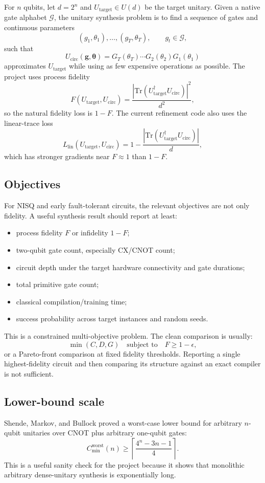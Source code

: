 \documentclass[11pt,a4paper]{article}
\newcommand{\Utarget}{U_{\mathrm{target}}}
\newcommand{\Ucirc}{U_{\mathrm{circ}}}
\newcommand{\Tr}{\mathrm{Tr}}
\begin{document}
For $n$ qubits, let $d=2^n$ and $\Utarget \in U(d)$ be the target unitary.
Given a native gate alphabet $\mathcal{G}$, the unitary synthesis problem is
to find a sequence of gates and continuous parameters
\[
  (g_1,\theta_1),\ldots,(g_T,\theta_T), \qquad g_t \in \mathcal{G},
\]
such that
\[
  \Ucirc(\bm{g},\bm{\theta})
  =
  G_T(\theta_T)\cdots G_2(\theta_2)G_1(\theta_1)
\]
approximates $\Utarget$ while using as few expensive operations as possible.
The project uses process fidelity
\[
  F(\Utarget,\Ucirc)
  =
  \frac{|\Tr(\Utarget^\dagger \Ucirc)|^2}{d^2},
\]
so the natural fidelity loss is $1-F$. The current refinement code also uses
the linear-trace loss
\[
  L_{\mathrm{lin}}(\Utarget,\Ucirc)
  =
  1-\frac{|\Tr(\Utarget^\dagger \Ucirc)|}{d},
\]
which has stronger gradients near $F \approx 1$ than $1-F$.

\subsection{Objectives}

For NISQ and early fault-tolerant circuits, the relevant objectives are not
only fidelity. A useful synthesis result should report at least:
\begin{itemize}[leftmargin=2em]
  \item process fidelity $F$ or infidelity $1-F$;
  \item two-qubit gate count, especially CX/CNOT count;
  \item circuit depth under the target hardware connectivity and gate durations;
  \item total primitive gate count;
  \item classical compilation/training time;
  \item success probability across target instances and random seeds.
\end{itemize}
This is a constrained multi-objective problem. The clean comparison is usually:
\[
  \min (C,D,G)
  \quad\text{subject to}\quad
  F \ge 1-\epsilon,
\]
or a Pareto-front comparison at fixed fidelity thresholds. Reporting a single
highest-fidelity circuit and then comparing its structure against an exact
compiler is not sufficient.

\subsection{Lower-bound scale}

Shende, Markov, and Bullock proved a worst-case lower bound for arbitrary
$n$-qubit unitaries over CNOT plus arbitrary one-qubit gates:
\[
  C_{\min}^{\mathrm{worst}}(n)
  \ge
  \left\lceil \frac{4^n-3n-1}{4} \right\rceil .
\]
This is a useful sanity check for the project because it shows that monolithic
arbitrary dense-unitary synthesis is exponentially long.
\end{document}
